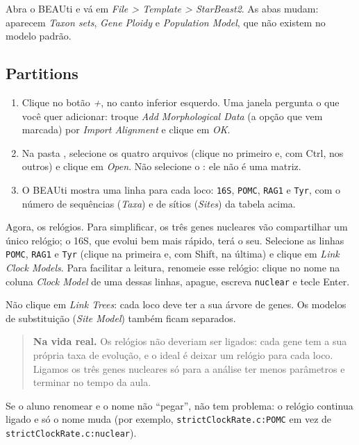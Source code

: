 \documentclass[11pt,a4paper]{article}
\newcommand{\arq}[1]{\path{#1}}
\newcommand{\ui}[1]{\textit{#1}}
\newcommand{\tecla}[1]{\textsf{#1}}
\begin{document}
Abra o BEAUti e vá em \ui{File > Template > StarBeast2}. As abas mudam: aparecem \ui{Taxon
sets}, \ui{Gene Ploidy} e \ui{Population Model}, que não existem no modelo padrão.

\subsection{Partitions}

\begin{enumerate}
\item Clique no botão \ui{+}, no canto inferior esquerdo. Uma janela pergunta o que você quer
adicionar: troque \ui{Add Morphological Data} (a opção que vem marcada) por \ui{Import
Alignment} e clique em \ui{OK}.
\item Na pasta \arq{dados}, selecione os quatro arquivos \arq{.nex} (clique no primeiro e, com
\tecla{Ctrl}, nos outros) e clique em \ui{Open}. Não selecione o \arq{especies.dat}: ele não é
uma matriz.
\item O BEAUti mostra uma linha para cada loco: \verb|16S|, \verb|POMC|, \verb|RAG1| e
\verb|Tyr|, com o número de sequências (\ui{Taxa}) e de sítios (\ui{Sites}) da tabela acima.
\end{enumerate}

Agora, os relógios. Para simplificar, os três genes nucleares vão compartilhar um único relógio;
o 16S, que evolui bem mais rápido, terá o seu.
Selecione as linhas \verb|POMC|, \verb|RAG1| e \verb|Tyr| (clique na primeira e, com
\tecla{Shift}, na última) e clique em \ui{Link Clock Models}. Para facilitar a leitura,
renomeie esse relógio: clique no nome na coluna \ui{Clock Model} de uma dessas linhas, apague,
escreva \verb|nuclear| e tecle \tecla{Enter}.

Não clique em \ui{Link Trees}: cada loco deve ter a sua árvore de genes. Os modelos de
substituição (\ui{Site Model}) também ficam separados.

\begin{quote}\small
\textbf{Na vida real.} Os relógios não deveriam ser ligados: cada gene tem a sua própria taxa
de evolução, e o ideal é deixar um relógio para cada loco. Ligamos os três genes nucleares só
para a análise ter menos parâmetros e terminar no tempo da aula.
\end{quote}

\begin{resposta}
Se o aluno renomear e o nome não ``pegar'', não tem problema: o relógio continua ligado e só o
nome muda (por exemplo, \verb|strictClockRate.c:POMC| em vez de
\verb|strictClockRate.c:nuclear|).
\end{resposta}
\end{document}
